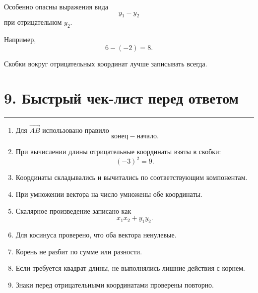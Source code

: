 \documentclass[a4paper,12pt]{article}
\newcommand{\vect}[1]{\overrightarrow{#1}}
\newcommand{\sectionline}{%
    \par\noindent
    {\color{accent}\rule{\linewidth}{0.6pt}}
    \par
}
\begin{document}
\begin{warningbox}
Особенно опасны выражения вида
\[
y_1-y_2
\]
при отрицательном \(y_2\).

Например,
\[
6-(-2)=8.
\]

Скобки вокруг отрицательных координат лучше записывать всегда.
\end{warningbox}


\section*{\color{darkaccent}9. Быстрый чек-лист перед ответом}

\sectionline

\begin{enumerate}[label=\(\square\),leftmargin=8mm,itemsep=4pt]
    \item Для \(\vect{AB}\) использовано правило
    \[
    \text{конец}-\text{начало}.
    \]

    \item При вычислении длины отрицательные координаты взяты в скобки:
    \[
    (-3)^2=9.
    \]

    \item Координаты складывались и вычитались по соответствующим компонентам.

    \item При умножении вектора на число умножены обе координаты.

    \item Скалярное произведение записано как
    \[
    x_1x_2+y_1y_2.
    \]

    \item Для косинуса проверено, что оба вектора ненулевые.

    \item Корень не разбит по сумме или разности.

    \item Если требуется квадрат длины, не выполнялись лишние действия с корнем.

    \item Знаки перед отрицательными координатами проверены повторно.
\end{enumerate}


\clearpage
\end{document}
